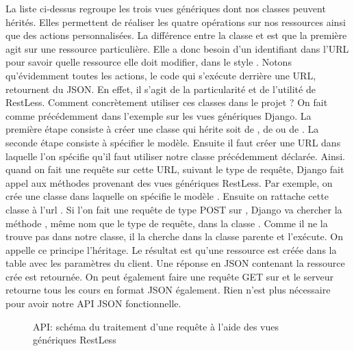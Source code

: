 \documentclass[letterpaper,10pt,oneside]{sphinxmanual}
\begin{document}
La liste ci-dessus regroupe les trois vues génériques dont nos classes peuvent hérités. Elles permettent de réaliser les quatre opérations sur nos ressources ainsi que des actions personnalisées. La différence entre la classe  et  est que la première agit sur une ressource particulière. Elle a donc besoin d'un identifiant dans l'URL pour savoir quelle ressource elle doit modifier, dans le style . Notons qu'évidemment toutes les actions, le code qui s'exécute derrière une URL, retournent du JSON. En effet, il s'agit de la particularité et de l'utilité de RestLess. Comment concrètement utiliser ces classes dans le projet ? On fait comme précédemment dans l'exemple sur les vues génériques Django. La première étape consiste à créer une classe qui hérite soit de , de  ou de . La seconde étape consiste à spécifier le modèle. Ensuite il faut créer une URL dans laquelle l'on spécifie qu'il faut utiliser notre classe précédemment déclarée. Ainsi. quand on fait une requête sur cette URL, suivant le type de requête, Django fait appel aux méthodes provenant des vues génériques RestLess. Par exemple, on crée une classe  dans laquelle on spécifie le modèle . Ensuite on rattache cette classe à l'url . Si l'on fait une requête de type POST sur , Django va chercher la méthode , même nom que le type de requête, dans la classe . Comme il ne la trouve pas dans notre classe, il la cherche dans la classe parente  et l'exécute. On appelle ce principe l'héritage. Le résultat est qu'une ressource est créée dans la table  avec les paramètres du client. Une réponse en JSON contenant la ressource crée est retournée. On peut également faire une requête GET sur  et le serveur retourne tous les cours en format JSON également. Rien n'est plus nécessaire pour avoir notre API JSON fonctionnelle.
\begin{figure}[htbp]
\centering
\capstart

\caption{API: schéma du traitement d'une requête à l'aide des vues génériques RestLess}\end{figure}
\end{document}
